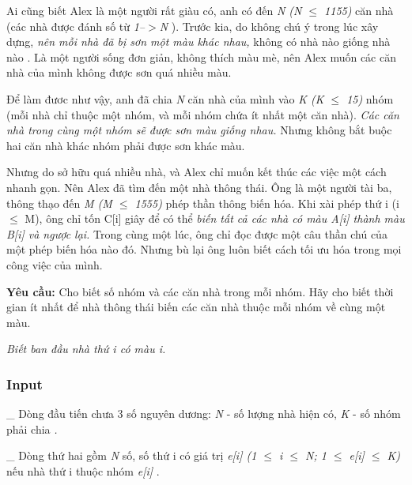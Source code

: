 



   Ai cũng biết Alex là một người rất giàu có, anh có đến   \emph{    N (N $\le$ 1155)   }   căn nhà (các nhà được đánh số từ   \emph{    1--$>$N   }   ). Trước kia, do không chú ý trong lúc xây dựng,   \emph{    nên mỗi nhà đã bị sơn một màu khác nhau,   }   không có nhà nào giống nhà nào . Là một người sống đơn giản, không thích màu mè, nên Alex muốn các căn nhà của mình không được sơn quá nhiều màu.  

   Để làm đươc như vậy, anh đã chia   \emph{    N   }   căn nhà của mình vào   \textbf{\emph{}}\emph{    K (K $\le$ 15)   }   nhóm (mỗi nhà chỉ thuộc một nhóm, và mỗi nhóm chứa ít nhất một căn nhà).   \emph{    Các căn nhà trong cùng một nhóm sẽ được sơn màu giống nhau.   }   Nhưng không bắt buộc hai căn nhà khác nhóm phải được sơn khác màu.   \emph{
\\}

   Nhưng do sở hữu quá nhiều nhà, và Alex chỉ muốn kết thúc các việc một cách nhanh gọn. Nên Alex đã tìm đến một nhà thông thái. Ông là một người tài ba, thông thạo đến   \emph{    M (M $\le$ 1555)   }   phép thần thông biến hóa. Khi xài phép thứ i (i $\le$ M), ông chỉ tốn C[i] giây để có thể   \emph{    biến tất cả các nhà có màu A[i] thành màu B[i] và ngược lại.   }   Trong cùng một lúc, ông chỉ đọc được một câu thần chú của một phép biến hóa nào đó.   \emph{}   Nhưng bù lại ông luôn biết cách tối ưu hóa trong mọi công việc của mình.   \emph{
\\}

\textbf{    Yêu cầu:   }   Cho biết số nhóm và các căn nhà trong mỗi nhóm. Hãy cho biết thời gian ít nhất để nhà thông thái biến các căn nhà thuộc mỗi nhóm về cùng một màu.  

\emph{    Biết ban đầu nhà thứ i có màu i.    
\\}

\subsubsection{   Input  }

   \_ Dòng đầu tiến chưa 3 số nguyên dương:   \emph{    N   }   - số lượng nhà hiện có,   \emph{    K   }   - số nhóm phải chia   \emph{    .   }

   \_ Dòng thứ hai gồm   \emph{    N   }   số, số thứ i có giá trị   \emph{    e[i] (1  $\le$  i  $\le$  N; 1  $\le$  e[i]  $\le$  K)   }   nếu nhà thứ i thuộc nhóm   \emph{    e[i]   }   .  

